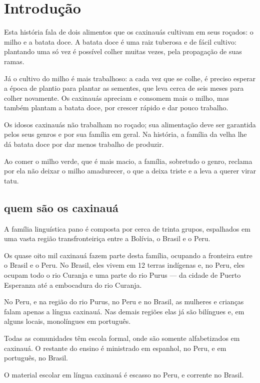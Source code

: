 \chapter{Introdução}


Esta história fala de dois alimentos que os caxinauás cultivam em seus roçados: o milho e a batata doce. A batata doce é uma raiz tuberosa e de fácil cultivo: plantando uma só vez é possível colher muitas vezes, pela propagação de suas ramas.

Já o cultivo do milho é mais trabalhoso: a cada vez que se colhe, é preciso esperar a época de plantio para plantar as sementes, que leva cerca de seis meses para colher novamente.
Os caxinauás apreciam e consomem mais o milho, mas também plantam a batata doce, por crescer rápido e dar pouco trabalho.


Os idosos caxinauás não trabalham no roçado; sua alimentação deve ser garantida pelos seus genros e por sua família em geral. Na história, a família da velha lhe dá batata doce
por dar menos trabalho de produzir.

Ao comer o milho verde, que é mais macio, a família, sobretudo o genro, reclama por ela não deixar o milho amadurecer, o que a deixa triste e a leva a querer virar tatu.


\section{quem são os caxinauá}


A família linguística pano é composta por cerca de trinta grupos, espalhados em uma vasta região transfronteiriça entre a Bolívia, o Brasil e o Peru.

Os quase oito mil caxinauá fazem parte desta família, ocupando a fronteira entre o Brasil
e o Peru. No Brasil, eles vivem em 12 terras indígenas e, no Peru, eles ocupam todo o rio Curanja e uma parte do rio Purus --- da cidade de Puerto Esperanza até a embocadura
do rio Curanja.

No Peru, e na região do rio Purus, no Peru e no Brasil, as mulheres e crianças falam apenas a língua caxinauá. Nas demais regiões elas já são bilíngues e, em alguns locais,
monolíngues em português.

Todas as comunidades têm escola formal, onde são somente alfabetizados em caxinauá. O
restante do ensino é ministrado em espanhol, no Peru, e em português, no Brasil. 

O material escolar em língua caxinauá é escasso no Peru, e corrente no Brasil.